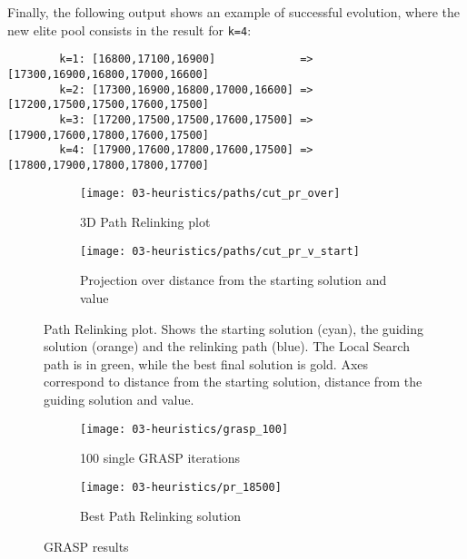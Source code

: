 Finally, the following output shows an example of successful evolution, where the new elite pool consists in the result for \texttt{k=4}:
\begin{footnotesize}
	\begin{verbatim}
		k=1: [16800,17100,16900]             => [17300,16900,16800,17000,16600]
		k=2: [17300,16900,16800,17000,16600] => [17200,17500,17500,17600,17500]
		k=3: [17200,17500,17500,17600,17500] => [17900,17600,17800,17600,17500]
		k=4: [17900,17600,17800,17600,17500] => [17800,17900,17800,17800,17700]
	\end{verbatim}
\end{footnotesize}

\begin{figure}[p]
	\centering
	\begin{subfigure}[b]{.49\textwidth}
		\centering
		\texttt{[image: 03-heuristics/paths/cut\_pr\_over]}
		\caption{3D Path Relinking plot}
		\label{fig:pr_over}
	\end{subfigure}
	\hfill
	\begin{subfigure}[b]{.49\textwidth}
		\centering
		\texttt{[image: 03-heuristics/paths/cut\_pr\_v\_start]}
		\caption{Projection over distance from the starting solution and value}
		\label{fig:pr_v_start}
	\end{subfigure}
	\caption{Path Relinking plot. Shows the starting solution (cyan), the guiding solution (orange) and the relinking path (blue). The Local Search path is in green, while the best final solution is gold. Axes correspond to distance from the starting solution, distance from the guiding solution and value.}
	\label{fig:path_relinking}
\end{figure}

\begin{figure}[p]
	\centering
	\begin{subfigure}[b]{.49\textwidth}
		\centering
		\texttt{[image: 03-heuristics/grasp\_100]}
		\caption{100 single GRASP iterations}
		\label{fig:grasp_100}
	\end{subfigure}
	\hfill
	\begin{subfigure}[b]{.49\textwidth}
		\centering
		\texttt{[image: 03-heuristics/pr\_18500]}
		\caption{Best Path Relinking solution}
		\label{fig:pr_18500}
	\end{subfigure}
	\label{fig:grasp_results}
	\caption{GRASP results}
\end{figure}

\vspace{20px}


